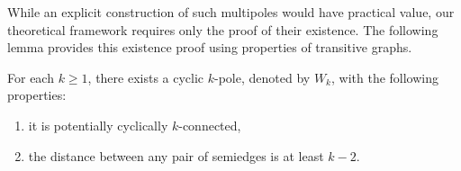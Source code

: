 \documentclass[12pt, twoside]{book}
\begin{document}
While an explicit construction of such multipoles would have practical value, our theoretical framework requires only the proof of their existence. The following lemma provides this existence proof using properties of transitive graphs.

\begin{lemma}\label{lem:cyclic-k-pole-no-short-cycles-exists}
	For each $k\geq 1$, there exists a cyclic $k$-pole, denoted by $W_k$, with the following properties:
	\begin{enumerate}[label=(\roman*)]
		\item it is potentially cyclically $k$-connected,
		\item the distance between any pair of semiedges is at least $k-2$.
	\end{enumerate}
\end{lemma}
\end{document}
